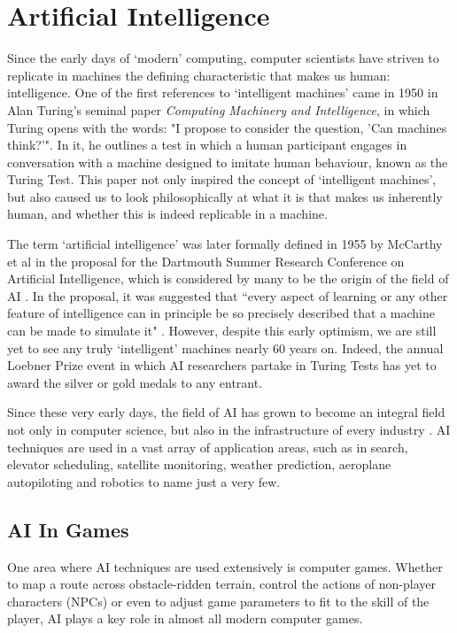 \documentclass[a4paper,oneside]{report}
\begin{document}
\chapter{Artificial Intelligence}

Since the early days of `modern' computing, computer scientists have striven to replicate in machines the defining characteristic that makes us human: intelligence. One of the first references to `intelligent machines' came in 1950 in Alan Turing's seminal paper \emph{Computing Machinery and Intelligence}, in which Turing opens with the words: "I propose to consider the question, 'Can machines think?'". In it, he outlines a test in which a human participant engages in conversation with a machine designed to imitate human behaviour, known as the Turing Test. This paper not only inspired the concept of `intelligent machines', but also caused us to look philosophically at what it is that makes us inherently human, and whether this is indeed replicable in a machine.

The term `artificial intelligence' was later formally defined in 1955 by McCarthy et al in the proposal for the Dartmouth Summer Research Conference on Artificial Intelligence, which is considered by many to be the origin of the field of AI \cite{Crevier:1993kl}. In the proposal, it was suggested that ``every aspect of learning or any other feature of intelligence can in principle be so precisely described that a machine can be made to simulate it" \cite{McCarthy:1955ve}. However, despite this early optimism, we are still yet to see any truly `intelligent' machines nearly 60 years on. Indeed, the annual Loebner Prize event in which AI researchers partake in Turing Tests has yet to award the silver or gold medals to any entrant. 

Since these very early days, the field of AI has grown to become an integral field not only in computer science, but also in the infrastructure of every industry \cite{Kurzweil:2005ly}. AI techniques are used in a vast array of application areas, such as in search, elevator scheduling, satellite monitoring, weather prediction, aeroplane autopiloting and robotics to name just a very few. 

\section{AI In Games}

One area where AI techniques are used extensively is computer games. Whether to map a route across obstacle-ridden terrain, control the actions of non-player characters (NPCs) or even to adjust game parameters to fit to the skill of the player, AI plays a key role in almost all modern computer games. 
\end{document}
